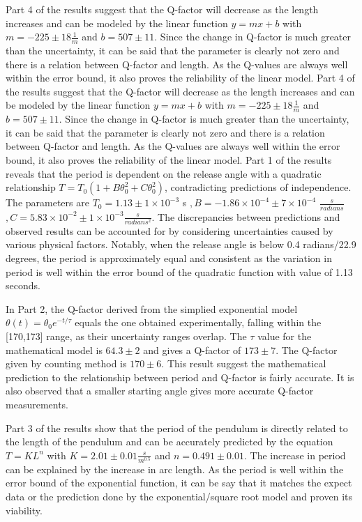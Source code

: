 \documentclass{article}
\begin{document}
Part 4 of the results suggest that the Q-factor will decrease as the length increases and can be modeled by the linear function $y = mx + b$ with $m = -225 \pm 18\frac{1}{m}$ and $b = 507 \pm 11$. Since the change in Q-factor is much greater than the uncertainty, it can be said that the parameter is clearly not zero and there is a relation between Q-factor and length. As the Q-values are always well within the error bound, it also proves the reliability of the linear model.
Part 4 of the results suggest that the Q-factor will decrease as the length increases and can be modeled by the linear function $y = mx + b$ with $m = -225 \pm 18\frac{1}{m}$ and $b = 507 \pm 11$. Since the change in Q-factor is much greater than the uncertainty, it can be said that the parameter is clearly not zero and there is a relation between Q-factor and length. As the Q-values are always well within the error bound, it also proves the reliability of the linear model.
Part 1 of the results reveals that the period is dependent on the release angle with a quadratic relationship $T = T_0(1 + B\theta_0^2 + C\theta_0^2)$, contradicting predictions of independence. The parameters are $T_0 = 1.13  \pm 1\times10^{-3} $ s $, B = -1.86\times10^{-4}  \pm 7\times10^{-4}$ $\frac{s}{radians}$ $, C = 5.83\times10^{-2} \pm 1\times10^{-3} \frac{s}{radians^2}$. The discrepancies between predictions and observed results can be accounted for by considering uncertainties caused by various physical factors. Notably, when the release angle is below 0.4 radians/22.9 degrees, the period is approximately equal and consistent as the variation in period is well within the error bound of the quadratic function with value of 1.13 seconds.

In Part 2, the Q-factor derived from the simplied exponential model $\theta(t) = \theta_0 e^{-t/\tau}$ equals the one obtained experimentally, falling within the [170,173] range, as their uncertainty ranges overlap. The $\tau$ value for the mathematical model  is $64.3 \pm 2$ and gives a Q-factor of $173 \pm 7$. The Q-factor given by counting method is $170 \pm 6$. This result suggest the mathematical prediction to the relationship between period and Q-factor is fairly accurate. It is also observed that a smaller starting angle gives more accurate Q-factor measurements.

Part 3 of the results show that the period of the pendulum is directly related to the length of the pendulum and can be accurately predicted by the equation $T = KL^n$ with $K = 2.01 \pm 0.01\frac{s}{m^{0.5}}$ and $n = 0.491 \pm 0.01$. The increase in period can be explained by the increase in arc length. As the period is well within the error bound of the exponential function, it can be say that it matches the expect data or the prediction done by the exponential/square root model and proven its viability. 
\end{document}
